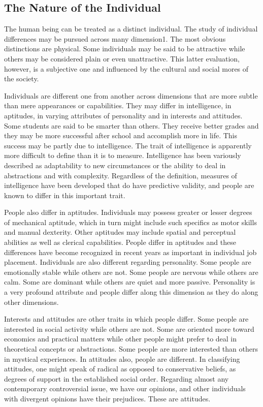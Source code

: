 \subsection{The Nature of the Individual}

The human being can be treated as a distinct individual. The study of individual differences may be pursued across many dimension1. The most obvious distinctions are physical. Some individuals may be said to be attractive while others may be considered plain or even unattractive. This latter evaluation, however, is a subjective one and influenced by the cultural and social mores of the society.

Individuals are different one from another across dimensions that are more subtle than mere appearances or capabilities. They may differ in intelligence, in aptitudes, in varying attributes of personality and in interests and attitudes. Some students are said to be smarter than others. They receive better grades and they may be more successful after school and accomplish more in life. This success may be partly due to intelligence. The trait of intelligence is apparently more difficult to define than it is to measure. Intelligence has been variously described as adaptability to new circumstances or the ability to deal in abstractions and with complexity. Regardless of the definition, measures of intelligence have been developed that do have predictive validity, and people are known to differ in this important trait.

People also differ in aptitudes. Individuals may possess greater or lesser degrees of mechanical aptitude, which in turn might include such specifics as motor skills and manual dexterity. Other aptitudes may include spatial and perceptual abilities as well as clerical capabilities. People differ in aptitudes and these differences have become recognized in recent years as important in individual job placement. Individuals are also different regarding personality. Some people are emotionally stable while others are not. Some people are nervous while others are calm. Some are dominant while others are quiet and more passive. Personality is a very profound attribute and people differ along this dimension as they do along other dimensions.

Interests and attitudes are other traits in which people differ. Some people are interested in social activity while others are not. Some are oriented more toward economics and practical matters while other people might prefer to deal in theoretical concepts or abstractions. Some people are more interested than others in mystical experiences. In attitudes also, people are different. In classifying attitudes, one might speak of radical as opposed to conservative beliefs, as degrees of support in the established social order. Regarding almost any contemporary controversial issue, we have our opinions, and other individuals with divergent opinions have their prejudices. These are attitudes.

